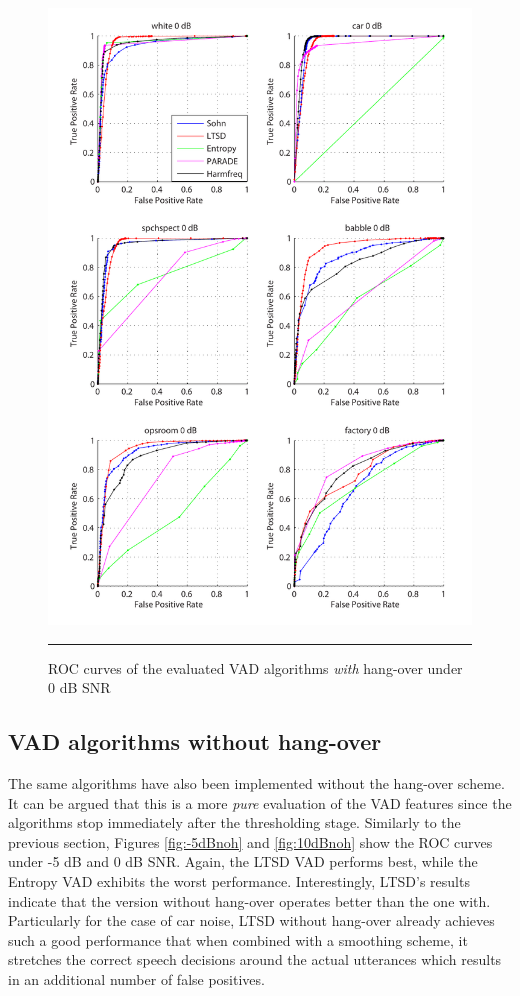 \begin{figure}[htbp]
	\centering
		\includegraphics[width=1.0\columnwidth]{Figures/Chapter4/0dBh.pdf}
		\rule{37em}{0.5pt}
	\caption[ROC curves of the evaluated algorithms \emph{with} hang-over under 0 dB SNR]{ROC curves of the evaluated VAD algorithms \emph{with} hang-over under 0 dB SNR}
	\label{fig:0dBh}
\end{figure}

\subsection{VAD algorithms without hang-over}

The same algorithms have also been implemented without the hang-over scheme. It can be argued that this is a more \emph{pure} evaluation of the VAD features since the algorithms stop immediately after the thresholding stage. Similarly to the previous section, Figures \ref{fig:-5dBnoh} and \ref{fig:10dBnoh} show the ROC curves under -5 dB and 0 dB SNR. Again, the LTSD VAD performs best, while the Entropy VAD exhibits the worst performance. Interestingly, LTSD's results indicate that the version without hang-over operates better than the one with. Particularly for the case of car noise, LTSD without hang-over already achieves such a good performance that when combined with a smoothing scheme, it stretches the correct speech decisions around the actual utterances which results in an additional number of false positives.

